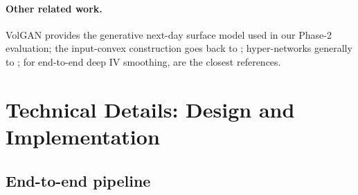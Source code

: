 \documentclass[11pt,a4paper]{article}
\begin{document}
\paragraph{Other related work.} VolGAN \citep{cont2025volgan} provides the
generative next-day surface model used in our Phase-2 evaluation; the
input-convex construction goes back to \citet{amos2017icnn};
hyper-networks generally to \citet{ha2017hypernetworks}; for end-to-end
deep IV smoothing, \citet{ackerer2020deep,boursin2024operator,
chataigner2020dlv} are the closest references.

\section{Technical Details: Design and Implementation}
\label{sec:tech}

\subsection{End-to-end pipeline}
\end{document}
